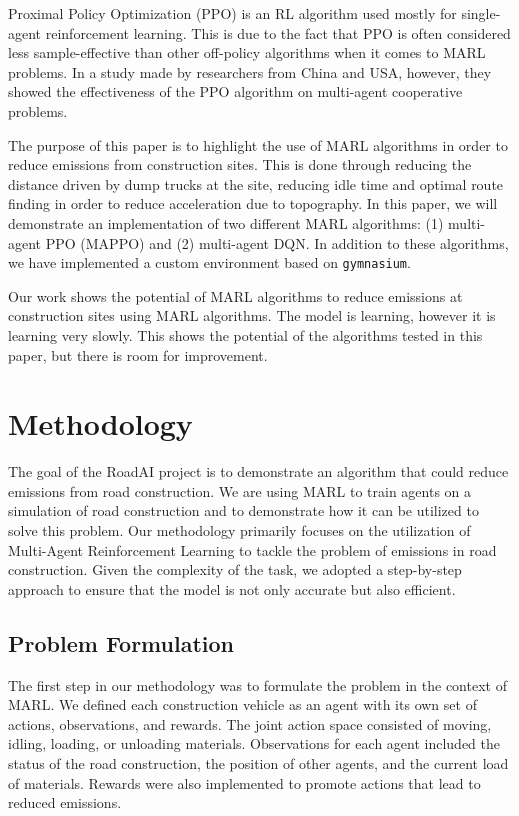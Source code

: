 \documentclass[conference]{IEEEtran}
\begin{document}

	Proximal Policy Optimization (PPO) is an RL algorithm used mostly for single-agent reinforcement learning.
	This is due to the fact that PPO is often considered less sample-effective than other off-policy algorithms
	when it comes to MARL problems. In a study made by researchers from China and USA, however, they showed the
	effectiveness of the PPO algorithm on multi-agent cooperative problems. \cite{yu2022surprising}


	The purpose of this paper is to highlight the use of MARL algorithms in order to reduce \coo{} emissions
	from construction sites. This is done through reducing the distance driven by dump trucks at the site,
	reducing idle time and optimal route finding in order to reduce acceleration due to topography. In this
	paper, we will demonstrate an implementation of two different MARL algorithms:
	(1) multi-agent PPO (MAPPO) and (2) multi-agent DQN. In addition to these algorithms, we have implemented a
	custom environment based on \texttt{gymnasium}. \cite{Towers_Gymnasium}

	Our work shows the potential of MARL algorithms to reduce emissions at construction sites using MARL
	algorithms. The model is learning, however it is learning very slowly. This shows the potential of
	the algorithms tested in this paper, but there is room for improvement.


	\section{Methodology}

	The goal of the RoadAI project is to demonstrate an algorithm that could reduce emissions from road construction.
	We are using MARL to train agents on a simulation of road construction and to demonstrate how it can be utilized to solve this problem.
	Our methodology primarily focuses on the utilization of Multi-Agent Reinforcement Learning to tackle the problem of emissions in road construction. Given the complexity of the task, we adopted a step-by-step approach to ensure that the model is not only accurate but also efficient.

	\subsection{Problem Formulation}
	The first step in our methodology was to formulate the problem in the context of MARL. We defined each construction vehicle as an agent with its own set of actions, observations, and rewards. The joint action space consisted of moving, idling, loading, or unloading materials. Observations for each agent included the status of the road construction, the position of other agents, and the current load of materials. Rewards were also implemented to promote actions that lead to reduced emissions.
\end{document}
